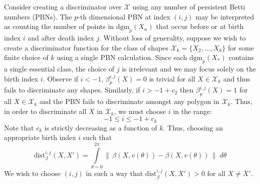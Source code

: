 \documentclass[10pt]{article}
\begin{document}
Consider creating a discriminator over $\mathcal{X}$ using any number of persistent Betti numbers (PBNs). The $p$-th dimensional PBN at index $(i,j)$ may be interpreted as counting the number of points in $\mathrm{dgm}_p(X_n)$ that occur before or at birth index $i$ and after death index $j$. Without loss of generality, suppose we wish to create a discriminator function for the class of shapes $\mathcal{X}_k = \{X_2, \dots, X_k \}$ for some finite choice of $k$ using a single PBN calculation. Since each $\mathrm{dgm}_p(X_\ast)$ contains a single essential class, the choice of $j$ is irrelevant and we may focus solely on the birth index $i$. Observe if $i < -1$, $\beta_p^{i,j}(X) = 0$ is trivial for all $X \in \mathcal{X}_k$ and thus fails to discriminate any shapes. Similarly, if $i > -1 + c_2$ then $\beta_p^{i,j}(X) = 1$ for all $X \in \mathcal{X}_k$ and the PBN fails to discriminate amongst any polygon in $\mathcal{X}_k$. Thus, in order to discriminate all $X$ in $\mathcal{X}_k$, we must choose $i$ in the range: 
$$
-1 \leq i \leq -1 + c_k
$$
Note that $c_k$ is strictly decreasing as a function of $k$. Thus, choosing an appropriate birth index $i$ such that 
$$ \mathrm{dist}_{\beta}^{i,j}(X, X') = \int\limits_{\theta=0}^{2\pi} \lVert \, \beta(X, v(\theta)) - \beta(X, v(\theta)) \, \rVert \; d\theta $$
We wish to choose $(i,j)$ in such a way that $\mathrm{dist}_{\beta}^{i,j}(X, X') >0$ for all $X \neq X'$.
 
\end{document}
